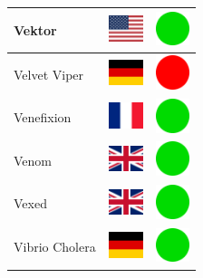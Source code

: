 \documentclass[12pt, a4paper, twoside]{report}
\begin{document}
\begin{center}
\begin{longtable}{|p{5cm}|p{2cm}|p{2cm}|}
 Vektor                                                     & \includegraphics[width=1cm]{../4x3/us} &   \includegraphics[width=1cm]{../likes/y} \\ \hline
 Velvet Viper                                               & \includegraphics[width=1cm]{../4x3/de} &   \includegraphics[width=1cm]{../likes/n} \\ \hline
 Venefixion                                                 & \includegraphics[width=1cm]{../4x3/fr} &   \includegraphics[width=1cm]{../likes/y} \\ \hline
 Venom                                                      & \includegraphics[width=1cm]{../4x3/gb} &   \includegraphics[width=1cm]{../likes/y} \\ \hline
 Vexed                                                      & \includegraphics[width=1cm]{../4x3/gb} &   \includegraphics[width=1cm]{../likes/y} \\ \hline
 Vibrio Cholera                                             & \includegraphics[width=1cm]{../4x3/de} &   \includegraphics[width=1cm]{../likes/y} \\ \hline

\end{longtable}
\end{center}
\end{document}
